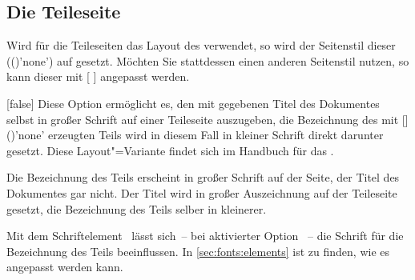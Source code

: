 \begin{Declaration*}{}
\begin{Declaration*}{}
\begin{Declaration*}{}
\subsection{Die Teileseite}
%
%
Wird für die Teileseiten das Layout des \CDs verwendet, so wird der Seitenstil 
dieser (()'none') auf 
 gesetzt. Möchten Sie stattdessen einen anderen 
Seitenstil nutzen, so kann dieser mit 
[%
]
angepasst werden.

\begin{Declaration}{}[false]%
\printdeclarationlist%
%
%
%
Diese Option ermöglicht es, den mit  gegebenen Titel des 
Dokumentes selbst in großer Schrift auf einer Teileseite auszugeben, die 
Bezeichnung des mit 
[]()'none' erzeugten 
Teils wird in diesem Fall in kleiner Schrift direkt darunter gesetzt. Diese 
Layout"=Variante findet sich im Handbuch für das \TUDCD. \notudscrartcl
%
\begin{values}{}
\itemfalse
  Die Bezeichnung des Teils erscheint in großer Schrift auf der Seite, der 
  Titel des Dokumentes gar nicht.
\itemtrue*
  Der Titel wird in großer Auszeichnung auf der Teileseite gesetzt, die 
  Bezeichnung des Teils selber in kleinerer.
\end{values}
\end{Declaration}

\begin{Declaration}[v2.02]{}
\printdeclarationlist%
%
%
Mit dem Schriftelement~ lässt sich~-- bei aktivierter Option
~-- die Schrift für die Bezeichnung des Teils beeinflussen. 
In \autoref{sec:fonts:elements} ist zu finden, wie es angepasst werden kann.
\end{Declaration}



\end{Declaration*}
\end{Declaration*}
\end{Declaration*}
